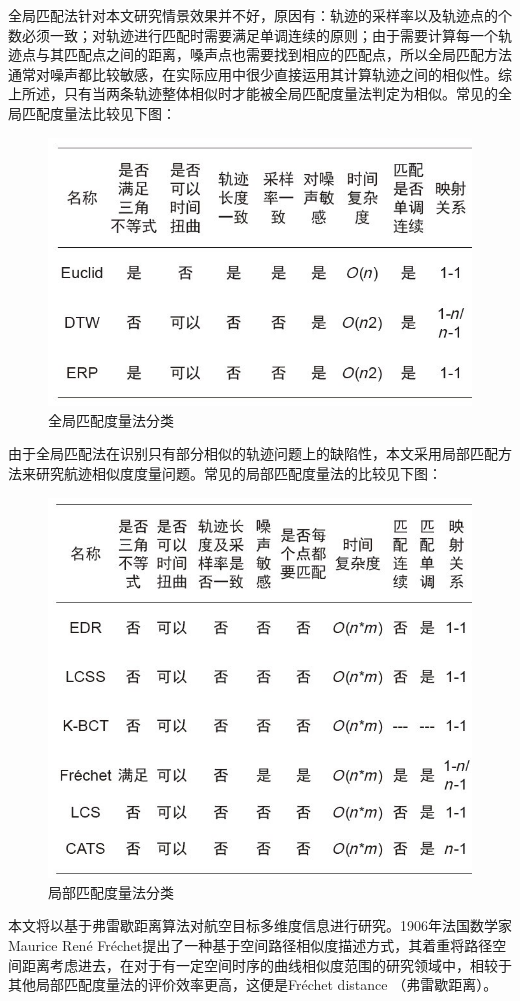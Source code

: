 \documentclass[GBK]{ctexart}
\begin{document}
\begin{spacing}{1.5}
全局匹配法针对本文研究情景效果并不好，原因有：轨迹的采样率以及轨迹点的个数必须一致；对轨迹进行匹配时需要满足单调连续的原则；由于需要计算每一个轨迹点与其匹配点之间的距离，嗓声点也需要找到相应的匹配点，所以全局匹配方法通常对噪声都比较敏感，在实际应用中很少直接运用其计算轨迹之间的相似性。综上所述，只有当两条轨迹整体相似时才能被全局匹配度量法判定为相似。常见的全局匹配度量法比较见下图：
\begin{figure}[H]
  \centering
  \includegraphics[scale=0.65]{quanju}
  \caption{全局匹配度量法分类}\label{quanju}
\end{figure}

由于全局匹配法在识别只有部分相似的轨迹问题上的缺陷性，本文采用局部匹配方法来研究航迹相似度度量问题。常见的局部匹配度量法的比较见下图：
\begin{figure}[H]
  \centering
  \includegraphics[scale=0.65]{jubu}
  \caption{局部匹配度量法分类}\label{jubu}
\end{figure}
本文将以基于弗雷歇距离算法\cite{flx}对航空目标多维度信息进行研究。1906年法国数学家Maurice  René   Fréchet提出了一种基于空间路径相似度描述方式，其着重将路径空间距离考虑进去，在对于有一定空间时序的曲线相似度范围的研究领域中，相较于其他局部匹配度量法的评价效率更高，这便是Fréchet distance （弗雷歇距离）。


\end{spacing}
\end{document}
